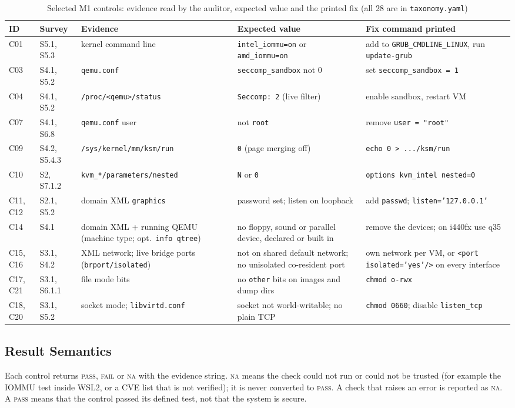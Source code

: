 \documentclass[conference]{IEEEtran}
\newcommand{\pass}{\textsc{pass}}
\newcommand{\fail}{\textsc{fail}}
\newcommand{\na}{\textsc{na}}
\begin{document}
\begin{table}[!t]
\caption{Selected M1 controls: evidence read by the auditor, expected value and the printed fix (all 28 are in \texttt{taxonomy.yaml})}
\label{tab:ctl}
\centering\footnotesize
\begin{tabular}{@{}llp{3.6cm}p{4.2cm}p{4.3cm}@{}}
\toprule
ID & Survey & Evidence & Expected value & Fix command printed \\
\midrule
C01 & S5.1, S5.3 & kernel command line & \texttt{intel\_iommu=on} or \texttt{amd\_iommu=on} & add to \texttt{GRUB\_CMDLINE\_LINUX}, run \texttt{update-grub} \\
C03 & S4.1, S5.2 & \texttt{qemu.conf} & \texttt{seccomp\_sandbox} not 0 & set \texttt{seccomp\_sandbox = 1} \\
C04 & S4.1, S5.2 & \texttt{/proc/<qemu>/status} & \texttt{Seccomp: 2} (live filter) & enable sandbox, restart VM \\
C07 & S4.1, S6.8 & \texttt{qemu.conf} user & not \texttt{root} & remove \texttt{user = "root"} \\
C09 & S4.2, S5.4.3 & \texttt{/sys/kernel/mm/ksm/run} & \texttt{0} (page merging off) & \texttt{echo 0 > .../ksm/run} \\
C10 & S2, S7.1.2 & \texttt{kvm\_*/parameters/nested} & \texttt{N} or \texttt{0} & \texttt{options kvm\_intel nested=0} \\
C11, C12 & S2.1, S5.2 & domain XML \texttt{graphics} & password set; listen on loopback & add \texttt{passwd}; \texttt{listen='127.0.0.1'} \\
C14 & S4.1 & domain XML + running QEMU (machine type; opt.\ \texttt{info qtree}) & no floppy, sound or parallel device, declared or built in & remove the devices; on i440fx use q35 \\
C15, C16 & S3.1, S4.2 & XML network; live bridge ports (\texttt{brport/isolated}) & not on shared default network; no unisolated co-resident port & own network per VM, or \texttt{<port isolated='yes'/>} on every interface \\
C17, C21 & S3.1, S6.1.1 & file mode bits & no \texttt{other} bits on images and dump dirs & \texttt{chmod o-rwx} \\
C18, C20 & S3.1, S5.2 & socket mode; \texttt{libvirtd.conf} & socket not world-writable; no plain TCP & \texttt{chmod 0660}; disable \texttt{listen\_tcp} \\
\bottomrule
\end{tabular}
\end{table}

\subsection{Result Semantics}
Each control returns \pass, \fail{} or \na{} with the evidence string. \na{} means the check could not run or could not be trusted (for example the IOMMU test inside WSL2, or a CVE list that is not verified); it is never converted to \pass. A check that raises an error is reported as \na. A \pass{} means that the control passed its defined test, not that the system is secure.
\end{document}
